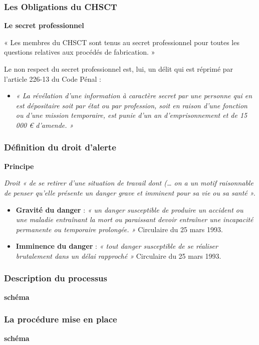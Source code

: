 \documentclass{beamer}
\begin{document}
\begin{frame}
\frametitle{Les Obligations du CHSCT}

\textbf{Le secret professionnel}

« Les membres du CHSCT sont tenus au secret professionnel pour toutes les questions relatives aux procédés de fabrication. »

Le non respect du secret professionnel est, lui, un délit qui est réprimé par l’article 226-13 du Code Pénal :

\begin{itemize}
        \item \textit{« La révélation d'une information à caractère secret par une personne qui en est dépositaire soit par état ou par profession, soit en raison d'une fonction ou d'une mission temporaire, est punie d'un an d'emprisonnement et de 15 000 \euro{} d'amende. »}
\end{itemize}
\end{frame}

\begin{frame}
\frametitle{Définition du droit d'alerte}

\textbf{Principe}

\textit{Droit « de se retirer d’une situation de travail dont (…  on a un motif raisonnable de penser qu’elle présente un danger grave et imminent pour sa vie ou sa santé ».}

\begin{itemize}
        \item \textbf{Gravité du danger} : \textit{« un danger susceptible de produire un accident ou une maladie entraînant la mort ou paraissant devoir entraîner une incapacité permanente ou temporaire prolongée. »} Circulaire du 25 mars 1993.
       
        \item \textbf{Imminence du danger} : \textit{« tout danger susceptible de se réaliser brutalement dans un délai rapproché »} Circulaire du 25 mars 1993.
\end{itemize}
\end{frame}

\begin{frame}
\frametitle{Description du processus}

\textbf{schéma}
\end{frame}

\begin{frame}
\frametitle{La procédure mise en place}

\textbf{schéma}
\end{frame}
\end{document}
